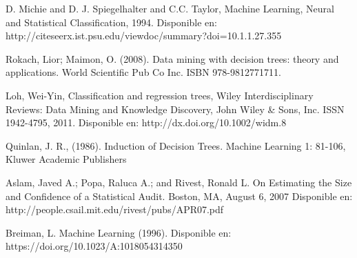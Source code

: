 \begin{thebibliography}{a}
	 D. Michie and D. J. Spiegelhalter and C.C. Taylor, 
	Machine Learning, Neural and Statistical Classification, 1994. Disponible en: 
	http://citeseerx.ist.psu.edu/viewdoc/summary?doi=10.1.1.27.355
	
	  Rokach, Lior; Maimon, O. (2008). Data mining with decision trees: theory and applications. World Scientific Pub Co Inc. ISBN 978-9812771711.

	 Loh, Wei-Yin, Classification and regression trees, Wiley Interdisciplinary Reviews: Data Mining and Knowledge Discovery, John Wiley \& Sons, Inc. ISSN 1942-4795, 2011. Disponible en: http://dx.doi.org/10.1002/widm.8	
	
	 Quinlan, J. R., (1986). Induction of Decision Trees. Machine Learning 1: 81-106, Kluwer Academic Publishers
	
	 Aslam, Javed A.; Popa, Raluca A.; and Rivest, Ronald L. On Estimating the Size and Confidence of a Statistical Audit. Boston, MA, August 6, 2007 Disponible en: http://people.csail.mit.edu/rivest/pubs/APR07.pdf
	
		Breiman, L. Machine Learning (1996). Disponible en: https://doi.org/10.1023/A:1018054314350
	
\end{thebibliography}
